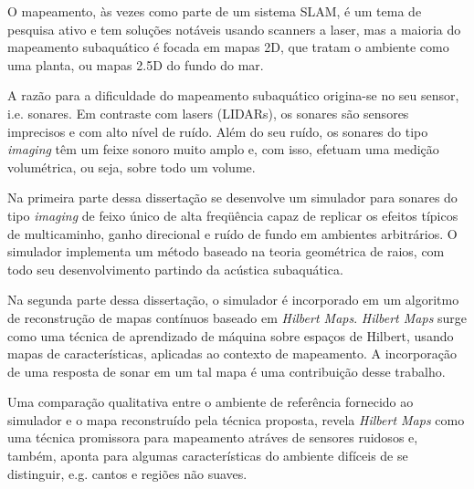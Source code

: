 O mapeamento, \`as vezes como parte de um sistema SLAM, \'e um tema de pesquisa
ativo e tem solu\c{c}\~oes not\'aveis usando scanners a laser, mas a maioria
do mapeamento subaqu\'atico \'e focada em mapas 2D,
que tratam o ambiente como uma planta, ou mapas 2.5D do fundo do mar.

A raz\~ao para a dificuldade do mapeamento subaqu\'atico origina-se no seu
sensor, i.e. sonares. Em contraste com lasers (LIDARs), os sonares s\~ao sensores imprecisos e com alto n\'ivel de ru\'ido. Al\'em do seu ru\'ido, os
sonares do tipo \textit{imaging} t\^em um feixe sonoro muito amplo e, com isso,
efetuam uma medi\c{c}\~ao volum\'etrica, ou seja, sobre todo um volume.

Na primeira parte dessa disserta\c{c}\~ao se desenvolve um simulador para
sonares do tipo \textit{imaging} de feixo único de alta freqü\^encia capaz de
replicar os efeitos t\'ipicos de multicaminho, ganho direcional e ru\'ido de fundo em ambientes
arbitr\'arios.
O simulador implementa um m\'etodo baseado na teoria geom\'etrica de raios, com
todo seu desenvolvimento partindo da ac\'ustica subaqu\'atica.

Na segunda parte dessa disserta\c{c}\~ao, o simulador \'e incorporado em um
algoritmo de reconstrução de mapas cont\'inuos baseado em \textit{Hilbert Maps}.
\textit{Hilbert Maps} surge como uma técnica de aprendizado de máquina sobre
espa\c{c}os de Hilbert, usando mapas de caracter\'isticas, aplicadas ao contexto
de mapeamento. A incorpora\c{c}\~ao de uma resposta de sonar em um tal
mapa \'e uma contribui\c{c}\~ao desse trabalho.

Uma compara\c{c}\~ao qualitativa entre o ambiente de referência fornecido ao
simulador e o mapa reconstru\'ido pela técnica proposta, revela \textit{Hilbert Maps}
como uma t\'ecnica promissora para mapeamento atráves de sensores ruidosos e, tamb\'em, aponta para algumas caracter\'isticas do ambiente dif\'iceis de se distinguir, e.g. cantos
e regiões não suaves.
